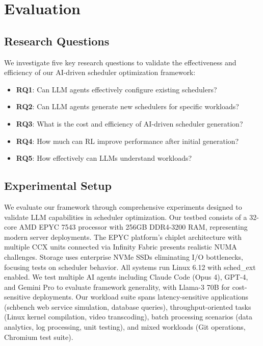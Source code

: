 \section{Evaluation}

\subsection{Research Questions}

We investigate five key research questions to validate the effectiveness and efficiency of our AI-driven scheduler optimization framework:

\begin{itemize}
\item \textbf{RQ1}: Can LLM agents effectively configure existing schedulers?
\item \textbf{RQ2}: Can LLM agents generate new schedulers for specific workloads?
\item \textbf{RQ3}: What is the cost and efficiency of AI-driven scheduler generation?
\item \textbf{RQ4}: How much can RL improve performance after initial generation?
\item \textbf{RQ5}: How effectively can LLMs understand workloads?
\end{itemize}

\subsection{Experimental Setup}

We evaluate our framework through comprehensive experiments designed to validate LLM capabilities in scheduler optimization. Our testbed consists of a 32-core AMD EPYC 7543 processor with 256GB DDR4-3200 RAM, representing modern server deployments. The EPYC platform's chiplet architecture with multiple CCX units connected via Infinity Fabric presents realistic NUMA challenges. Storage uses enterprise NVMe SSDs eliminating I/O bottlenecks, focusing tests on scheduler behavior. All systems run Linux 6.12 with sched\_ext enabled. We test multiple AI agents including Claude Code (Opus 4), GPT-4, and Gemini Pro to evaluate framework generality, with Llama-3 70B for cost-sensitive deployments. Our workload suite spans latency-sensitive applications (schbench web service simulation, database queries), throughput-oriented tasks (Linux kernel compilation, video transcoding), batch processing scenarios (data analytics, log processing, unit testing), and mixed workloads (Git operations, Chromium test suite).

